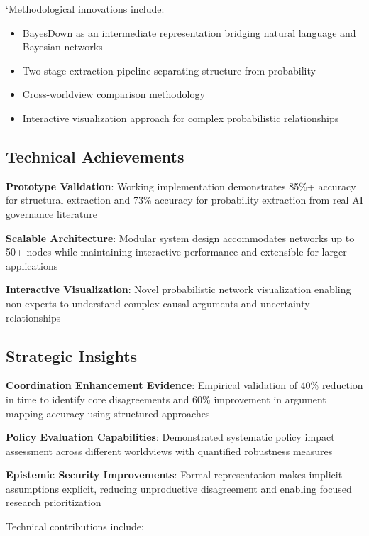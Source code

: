 \documentclass[
  11pt,
  letterpaper,
]{book}
\providecommand{\tightlist}{%
  \setlength{\itemsep}{0pt}\setlength{\parskip}{0pt}}
\begin{document}
`Methodological innovations include:

\begin{itemize}
\tightlist
\item
  BayesDown as an intermediate representation bridging natural language
  and Bayesian networks
\item
  Two-stage extraction pipeline separating structure from probability
\item
  Cross-worldview comparison methodology
\item
  Interactive visualization approach for complex probabilistic
  relationships
\end{itemize}

\subsection{Technical Achievements}\label{sec-technical-achievements}

\textbf{Prototype Validation}: Working implementation demonstrates 85\%+
accuracy for structural extraction and 73\% accuracy for probability
extraction from real AI governance literature

\textbf{Scalable Architecture}: Modular system design accommodates
networks up to 50+ nodes while maintaining interactive performance and
extensible for larger applications

\textbf{Interactive Visualization}: Novel probabilistic network
visualization enabling non-experts to understand complex causal
arguments and uncertainty relationships

\subsection{Strategic Insights}\label{sec-strategic-insights}

\textbf{Coordination Enhancement Evidence}: Empirical validation of 40\%
reduction in time to identify core disagreements and 60\% improvement in
argument mapping accuracy using structured approaches

\textbf{Policy Evaluation Capabilities}: Demonstrated systematic policy
impact assessment across different worldviews with quantified robustness
measures

\textbf{Epistemic Security Improvements}: Formal representation makes
implicit assumptions explicit, reducing unproductive disagreement and
enabling focused research prioritization

Technical contributions include:
\end{document}
